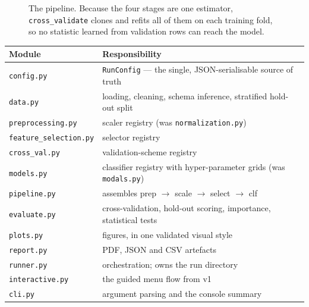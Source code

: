\documentclass[11pt,a4paper]{article}
\begin{document}
\begin{figure}[htbp]
\caption{The pipeline. Because the four stages are one estimator,
\texttt{cross\_validate} clones and refits all of them on each training fold,
so no statistic learned from validation rows can reach the model.}
\label{fig:arch}
\end{figure}

\begin{center}
\begin{tabularx}{\textwidth}{L{4.15cm} X}
\toprule
\textbf{Module} & \textbf{Responsibility} \\
\midrule
\texttt{config.py} & \texttt{RunConfig} --- the single, JSON-serialisable source of truth \\
\texttt{data.py} & loading, cleaning, schema inference, stratified hold-out split \\
\texttt{preprocessing.py} & scaler registry (was \texttt{normalization.py}) \\
\texttt{feature\_selection.py} & selector registry \\
\texttt{cross\_val.py} & validation-scheme registry \\
\texttt{models.py} & classifier registry with hyper-parameter grids (was \texttt{modals.py}) \\
\texttt{pipeline.py} & assembles \textsf{prep} $\to$ \textsf{scale} $\to$ \textsf{select} $\to$ \textsf{clf} \\
\texttt{evaluate.py} & cross-validation, hold-out scoring, importance, statistical tests \\
\texttt{plots.py} & figures, in one validated visual style \\
\texttt{report.py} & PDF, JSON and CSV artefacts \\
\texttt{runner.py} & orchestration; owns the run directory \\
\texttt{interactive.py} & the guided menu flow from v1 \\
\texttt{cli.py} & argument parsing and the console summary \\
\bottomrule
\end{tabularx}
\end{center}
\end{document}
